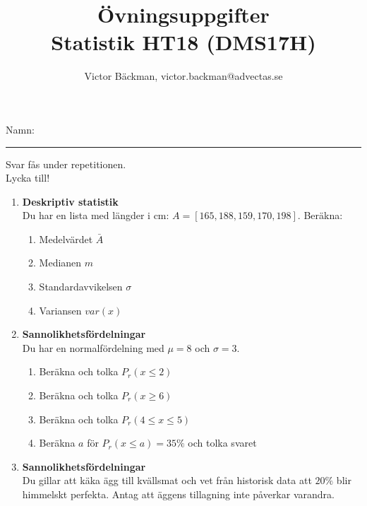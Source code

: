 \documentclass[a4paper,10pt]{article}
\title{Övningsuppgifter\\ {Statistik HT18 (DMS17H)}}
\author{Victor Bäckman, victor.backman@advectas.se}
\begin{document}
\maketitle
\vspace{2cm}
Namn:
{\rule{13cm}{0.4pt}}
\vspace{5cm}
\begin{center}
  Svar fås under repetitionen. \\
  \vspace{3cm}
  {\huge Lycka till!}
\end{center}

\newpage
\begin{enumerate}
    \item{{\bf Deskriptiv statistik} \\ Du har en lista med längder i cm: $A=[165, 188, 159, 170, 198]$. Beräkna:}
    \begin{enumerate}
      \item{Medelvärdet $\bar{A}$}
      \vspace{3cm}
      \item{Medianen $m$}
      \vspace{3cm}
      \item{Standardavvikelsen $\sigma$}
      \vspace{3cm}
      \item{Variansen $var(x)$}
    \end{enumerate}
    \newpage
    \item{{\bf Sannolikhetsfördelningar} \\ Du har en normalfördelning med $\mu = 8$ och $\sigma=3$.}
    \begin{enumerate}
      \item{Beräkna och tolka $P_r(x \leq 2)$}
      \vspace{6cm}
      \item{Beräkna och tolka $P_r(x \geq 6)$}
      \vspace{6cm}
      \item{Beräkna och tolka $P_r(4 \leq x \leq 5)$}
      \newpage
      \item{Beräkna $a$ för $P_r(x \leq a) = 35\%$ och tolka svaret}
    \end{enumerate}
    \newpage
    \item{{\bf Sannolikhetsfördelningar}\\ Du gillar att käka ägg till kvällsmat och vet från historisk data att $20\%$ blir himmelskt perfekta. Antag att äggens tillagning inte påverkar varandra.}
    \begin{enumerate}\label{egg}

\end{enumerate}
\end{enumerate}
\end{document}
